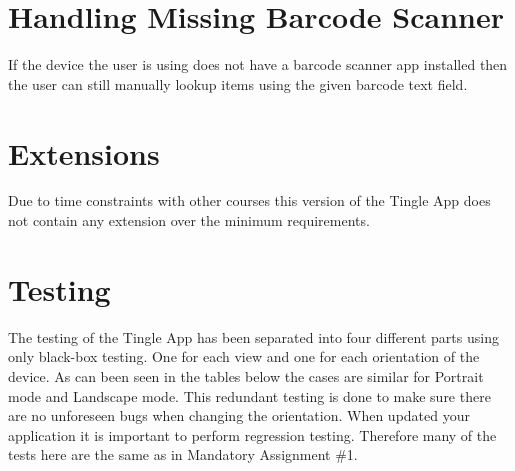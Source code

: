 \section{Handling Missing Barcode Scanner}
If the device the user is using does not have a barcode scanner app installed then the user can still manually lookup items using the given
barcode text field.

\section{Extensions }
Due to time constraints with other courses this version of the Tingle
App does not contain any extension over the minimum requirements.

\section{Testing}
The testing of the Tingle App has been separated into four different parts using only black-box testing. One for each view and one for each orientation of the device. As can been seen in the tables below the cases are similar for Portrait mode and Landscape mode. This redundant testing is done to make sure there are no unforeseen bugs when changing the orientation. When updated your application it is important to perform regression testing. Therefore many of the tests here are the same as in Mandatory Assignment \#1.

